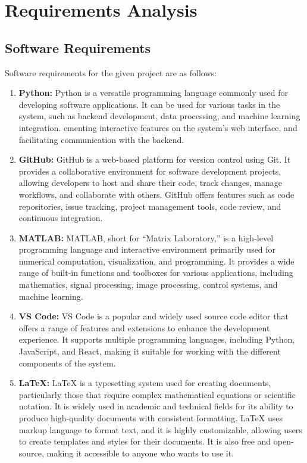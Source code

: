 \chapter{Requirements Analysis}
\section{Software Requirements}
Software requirements for the given project are as follows:
\begin{enumerate}[noitemsep]
    \item \textbf{Python:} 
    Python is a versatile programming language commonly used for \mbox{developing} software applications. It can be used for various tasks in the system, such as backend development, data processing, and machine learning integration.
    ementing interactive features on the system’s web interface, and facilitating communication with the backend. 
    \item \textbf{GitHub:}
    GitHub is a web-based platform for version control using Git. It provides a collaborative environment for software development projects, allowing developers to host and share their code, track changes, manage workflows, and collaborate with others. GitHub offers features such as code repositories, issue tracking, project management tools, code review, and continuous integration.
    \item \textbf{MATLAB:}
    MATLAB, short for ``Matrix Laboratory,'' is a high-level programming language and interactive environment primarily used for numerical computation, visualization, and programming. It provides a wide range of built-in functions and toolboxes for various applications, including mathematics, signal processing, image processing, control systems, and machine learning.
    \item \textbf{VS Code:}
    VS Code is a popular and widely used source code editor that offers a range of features and extensions to enhance the development experience. It supports multiple programming languages, including Python, JavaScript, and React, making it suitable for working with the different components of the system. 
    \item \textbf{LaTeX:}
    LaTeX is a typesetting system used for creating documents, particularly those that require complex mathematical equations or scientific notation. It is widely used in academic and technical fields for its ability to produce high-quality documents with consistent formatting. LaTeX uses markup language to format text, and it is highly customizable, allowing users to create templates and styles for their documents. It is also free and open-source, making it accessible to anyone who wants to use it.
    \end{enumerate}
